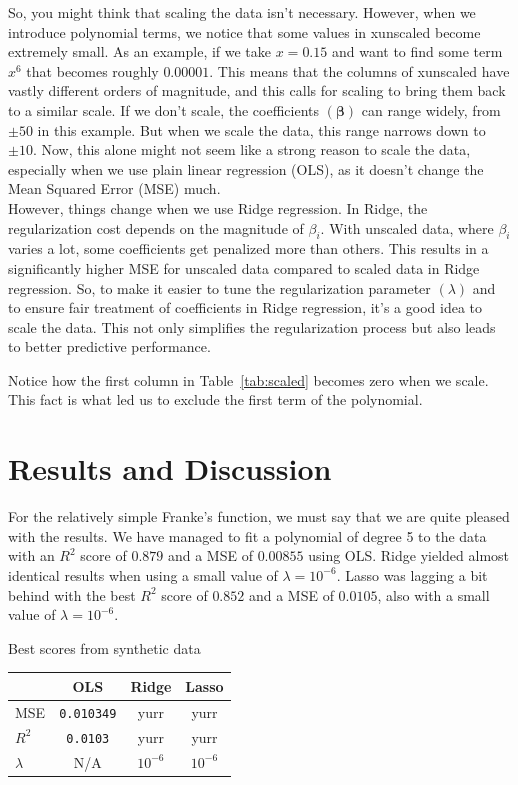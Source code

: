 \documentclass[twoside,11pt]{report}
\begin{document}
So, you might think that scaling the data isn't necessary.
However, when we introduce polynomial terms, we notice that some values in xunscaled become extremely small. As an example, 
if we take $x=0.15$ and want to find some term $x^6$ that becomes roughly $0.00001$. This means that the columns of xunscaled have vastly different orders of magnitude, and this calls 
for scaling to bring them back to a similar scale.
If we don't scale, the coefficients $(\boldsymbol{\beta})$ can range widely, from $\pm 50$ in this example. 
But when we scale the data, this range narrows 
down to $\pm 10$. Now, this alone might not seem like a strong reason to scale the data, especially when we use plain 
linear regression (OLS), as it doesn't change the Mean Squared Error (MSE) much.\\
However, things change when we use Ridge regression. In Ridge, the regularization cost depends on the magnitude of $\beta_i$.
With unscaled data, where $\beta_i$ varies a lot, some coefficients get penalized more than others. This results in a 
significantly higher MSE for unscaled data compared to scaled data in Ridge regression.
So, to make it easier to tune the regularization parameter $(\lambda)$ and to ensure fair treatment of coefficients in Ridge regression, 
it's a good idea to scale the data. This not only simplifies the regularization process but also leads to better predictive performance.

Notice how the first column in Table~\ref{tab:scaled} becomes zero when we scale. This fact is what led us to exclude the first term of the polynomial.










\section{Results and Discussion}
\label{sec:resultsdiscussion}


For the relatively simple Franke's function, we must say that we are quite pleased with the results.
We have managed to fit a polynomial of degree 5 to the data with an $R^2$ score of $0.879$ and a MSE of $0.00855$ 
using OLS. Ridge yielded almost identical results  when using a small value of $\lambda = 10^{-6}$.
Lasso was lagging a bit behind with the best $R^2$ score of $0.852$ and a MSE of $0.0105$, 
also with a small value of $\lambda = 10^{-6}$.
\begin{mytable}[float=!h,label=tab:toyscores, width=0.5\textwidth]{Best scores from synthetic data}
\vspace{1mm}
\centering
\begin{tabular}{l|c|c|c}
    & OLS & Ridge & Lasso \\
    \hline
    MSE  &   \texttt{0.010349} & yurr & yurr \\
    $R^2$     &   \texttt{0.0103} & yurr & yurr \\
    $\lambda$ &  N/A  & $10^{-6}$ & $10^{-6}$ 
\end{tabular}%
\end{mytable}
\end{document}
